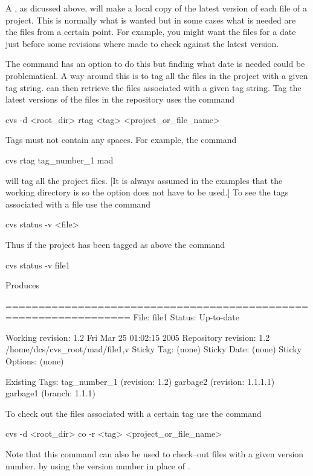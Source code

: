 A , as dicussed above, will make a local copy of the latest
version of each file of a project. This is normally what is wanted but
in some cases what is needed are the files from a certain point. For
example, you might want the files for a date just before some
revisions where made to check against the latest version. 

The  command has an option to do this but finding what date
is needed could be problematical. A way around this is to tag all
the files in the project with a given tag string. \cvs can then
retrieve the files associated with a given tag string. Tag the
latest versions of the files in the repository uses the command
\begin{example}
  cvs -d <root_dir> rtag <tag> <project_or_file_name>
\end{example}
Tags must not contain any spaces. For example, the command
\begin{example}
  cvs rtag tag_number_1 mad
\end{example}
will tag all the  project files. [It is always assumed in the
examples that the working directory is  so the  option
does not have to be used.] To see the tags associated with a file use
the command
\begin{example}
  cvs status -v <file>
\end{example}
Thus if the  project has been tagged as above the command
\begin{example}
  cvs status -v file1
\end{example}
Produces
\begin{example}
  =================================================================
  File: file1             Status: Up-to-date
  
     Working revision:    1.2     Fri Mar 25 01:02:15 2005             
     Repository revision: 1.2     /home/dcs/cvs_root/mad/file1,v
     Sticky Tag:          (none)
     Sticky Date:         (none)
     Sticky Options:      (none)
  
     Existing Tags:
          tag_number_1                    (revision: 1.2)
          garbage2                        (revision: 1.1.1.1)
          garbage1                        (branch: 1.1.1)
\end{example}

To check out the files associated with a certain tag use the command
\begin{example}
  cvs -d <root_dir> co -r <tag> <project_or_file_name>
\end{example}
Note that this command can also be used to check--out files with a
given version number. by using the version number in place of
.

